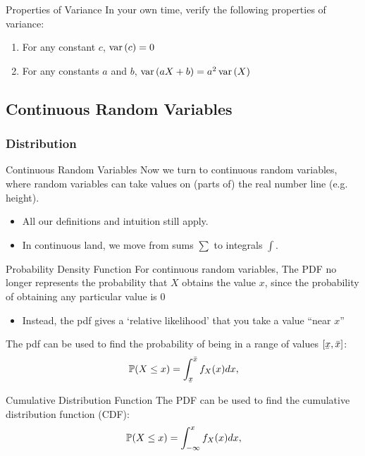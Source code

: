 \documentclass[aspectratio=169,t,11pt,table]{beamer}
\begin{document}
\begin{frame}{ Properties of Variance}
  In your own time, verify the following properties of variance:
  \begin{enumerate}
    \item For any constant $c$, $\var{c} = 0$
    \item For any constants $a$ and $b$, $\var{aX + b} = a^2 \var{X}$
  \end{enumerate}
\end{frame}

\subsection*{Continuous Random Variables}

\subsubsection*{Distribution}

\begin{frame}{Continuous Random Variables}
  Now we turn to \alert{continuous random variables}, where random variables can take values on (parts of) the real number line (e.g. height).
  \begin{itemize}
    \item All our definitions and intuition still apply.

    \item In continuous land, we move from sums $\sum$ to integrals $\int$.
  \end{itemize}
\end{frame}

\begin{frame}{Probability Density Function}
  For continuous random variables, The PDF no longer represents the probability that $X$ obtains the value $x$, since the probability of obtaining any particular value is 0
  \begin{itemize}
    \item Instead, the pdf gives a `relative likelihood' that you take a value ``near $x$''
  \end{itemize}

  \pause
  \bigskip
  The pdf can be used to find the probability of being in a range of values $[\ubar{x}, \bar{x}]$:
  \[
    \P{X \leq x} = \int_{\ubar{x}}^{\bar{x}} f_{X}(x) dx,
  \]
\end{frame}

\begin{frame}{Cumulative Distribution Function}
  The PDF can be used to find the cumulative distribution function (CDF):
  \[
    \P{X \leq x} = \int_{-\infty}^x f_{X}(x) dx,
  \]
\end{frame}
\end{document}
